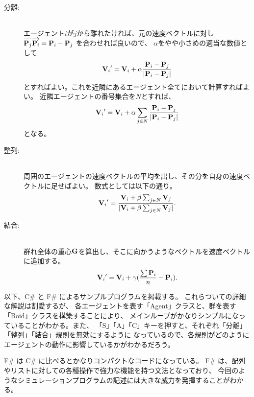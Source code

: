 \begin{description}
 \item[分離:] ~ \\
エージェント\(i\)が\(j\)から離れたければ、元の速度ベクトルに対し
\(\overrightarrow{\mathbf{P}_j\mathbf{P}_i} = \mathbf{P}_i - \mathbf{P}_j\) を合わせれば良いので、
\(\alpha\)をやや小さめの適当な数値として
\begin{equation}
	{\mathbf{V}_i}' = \mathbf{V}_i + \alpha \frac{\mathbf{P}_i - \mathbf{P}_j}{|\mathbf{P}_i - \mathbf{P}_j|}
\end{equation}
とすればよい。これを近隣にあるエージェント全てにおいて計算すればよい。
近隣エージェントの番号集合を\(N\)とすれば、
\begin{equation}
	{\mathbf{V}_i}' = \mathbf{V}_i + \alpha \sum_{j \in N}\frac{\mathbf{P}_i - \mathbf{P}_j}{|\mathbf{P}_i - \mathbf{P}_j|}
\end{equation}
となる。

\item[整列:] ~ \\
周囲のエージェントの速度ベクトルの平均を出し、その分を自身の速度ベクトルに足せばよい。
数式としては以下の通り。
\begin{equation}
	{\mathbf{V}_i}' = \frac{\mathbf{V}_i + \beta\sum_{j \in N}\mathbf{V}_j}{|\mathbf{V}_i + \beta\sum_{j \in N}\mathbf{V}_j|} .
\end{equation}

\item[結合:] ~ \\
群れ全体の重心\(\mathbf{G}\)を算出し、そこに向かうようなベクトルを速度ベクトルに追加する。
\begin{equation}
	{\mathbf{V}_i}' = \mathbf{V}_i + \gamma (\frac{\sum\mathbf{P}_i}{n} - \mathbf{P}_i) .
\end{equation}
\end{description}

以下、C\# と F\# によるサンプルプログラムを掲載する。
これらついての詳細な解説は割愛するが、
各エージェントを表す「Agent」クラスと、群を表す「Boid」クラスを構築することにより、
メインループがかなりシンプルになっていることがわかる。また、
「S」「A」「C」キーを押すと、それぞれ「分離」「整列」「結合」規則を無効にするように
なっているので、各規則がどのようにエージェントの動作に影響しているかがわかるだろう。

F\# は C\# に比べるとかなりコンパクトなコードになっている。
F\# は、配列やリストに対しての各種操作で強力な機能を持つ文法となっており、
今回のようなシミュレーションプログラムの記述には大きな威力を発揮することがわかる。

